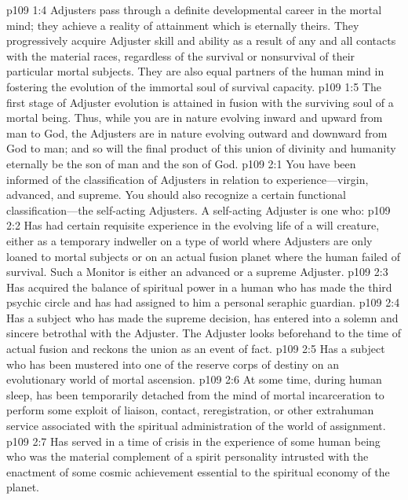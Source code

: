 \vs p109 1:4 Adjusters pass through a definite developmental career in the mortal mind; they achieve a reality of attainment which is eternally theirs. They progressively acquire Adjuster skill and ability as a result of any and all contacts with the material races, regardless of the survival or nonsurvival of their particular mortal subjects. They are also equal partners of the human mind in fostering the evolution of the immortal soul of survival capacity.\plusone
\vs p109 1:5 The first stage of Adjuster evolution is attained in fusion with the surviving soul of a mortal being. Thus, while you are in nature evolving inward and upward from man to God, the Adjusters are in nature evolving outward and downward from God to man; and so will the final product of this union of divinity and humanity eternally be the son of man and the son of God.
\vs p109 2:1 You have been informed of the classification of Adjusters in relation to experience---virgin, advanced, and supreme. You should also recognize a certain functional clas\-si\-fi\-ca\-tion---the self\hyp{}acting Adjusters. A self\hyp{}acting Adjuster is one who:
\pc \vs p109 2:2 \bibnobreakspace Has had certain requisite experience in the evolving life of a will creature, either as a temporary indweller on a type of world where Adjusters are only loaned to mortal subjects or on an actual fusion planet where the human failed of survival. Such a Monitor is either an advanced or a supreme Adjuster.
\vs p109 2:3 \bibnobreakspace Has acquired the balance of spiritual power in a human who has made the third psychic circle and has had assigned to him a personal seraphic guardian.
\pc \vs p109 2:4 \bibnobreakspace Has a subject who has made the supreme decision, has entered into a solemn and sincere betrothal with the Adjuster. The Adjuster looks beforehand to the time of actual fusion and reckons the union as an event of fact.
\pc \vs p109 2:5 \bibnobreakspace Has a subject who has been mustered into one of the reserve corps of destiny on an evolutionary world of mortal ascension.
\pc \vs p109 2:6 \bibnobreakspace At some time, during human sleep, has been temporarily detached from the mind of mortal incarceration to perform some exploit of liaison, contact, reregistration, or other extrahuman service associated with the spiritual administration of the world of assignment.
\pc \vs p109 2:7 \bibnobreakspace Has served in a time of crisis in the experience of some human being who was the material complement of a spirit personality intrusted with the enactment of some cosmic achievement essential to the spiritual economy of the planet.
